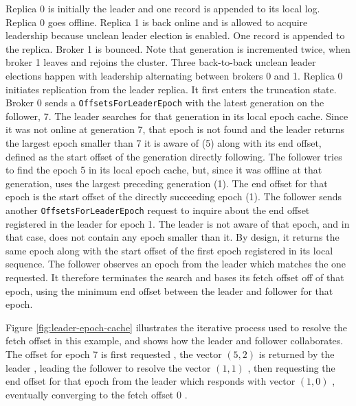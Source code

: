 \documentclass{article}
\newcommand*\circled[1]{\tikz[baseline=(char.base)]{
		\node[shape=circle,draw,inner sep=1pt] (char) {#1};}}
\begin{document}
\begin{outline}[enumerate]
	\1 Replica 0 is initially the leader and one record is appended to its local log.
	\1 Replica 0 goes offline. Replica 1 is back online and is allowed to acquire leadership because unclean leader election is enabled. One record is appended to the replica.
	\1 Broker 1 is bounced. Note that generation is incremented twice, when broker 1 leaves and rejoins the cluster.
	\1 Three back-to-back unclean leader elections happen with leadership alternating between brokers 0 and 1.
	\1 Replica 0 initiates replication from the leader replica. It first enters the truncation state. Broker 0 sends a \texttt{OffsetsForLeaderEpoch} with the latest generation on the follower, 7. The leader searches for that generation in its local epoch cache. Since it was not online at generation 7, that epoch is not found and the leader returns the largest epoch smaller than 7 it is aware of (5) along with its end offset, defined as the start offset of the generation directly following.
	\1 The follower tries to find the epoch 5 in its local epoch cache, but, since it was offline at that generation, uses the largest preceding generation (1). The end offset for that epoch is the start offset of the directly succeeding epoch (1).
	\1 The follower sends another \texttt{OffsetsForLeaderEpoch} request to inquire about the end offset registered in the leader for epoch 1. The leader is not aware of that epoch, and in that case, does not contain any epoch smaller than it. By design, it returns the same epoch along with the start offset of the first epoch registered in its local sequence.
	\1 The follower observes an epoch from the leader which matches the one requested. It therefore terminates the search and bases its fetch offset off of that epoch, using the minimum end offset between the leader and follower for that epoch.
\end{outline}

Figure \ref{fig:leader-epoch-cache} illustrates the iterative process used to resolve the fetch offset in this example, and shows how the leader and follower collaborates. The offset for epoch 7 is first requested \circled{1}, the vector $(5,2)$ is returned by the leader \circled{2}, leading the follower to resolve the vector $(1,1)$ \circled{3}, then requesting the end offset for that epoch from the leader which responds with vector $(1,0)$ \circled{4}, eventually converging to the fetch offset 0 \circled{5}.
\end{document}
